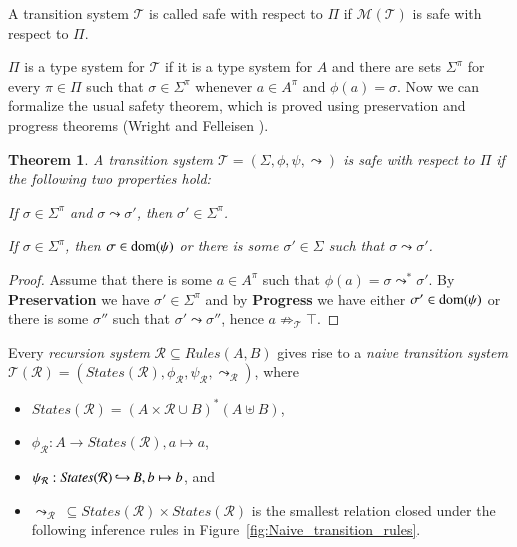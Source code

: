 \documentclass[a4paper,draft,preprint,sort&compress]{elsarticle}
\newtheorem{theorem}[definition]{Theorem}
\newcommand{\M}{\ensuremath{\mathcal{M}}}
\newcommand{\R}{\ensuremath{\mathcal{R}}}
\newcommand{\T}{\ensuremath{\mathcal{T}}}
\newcommand{\Rules}{\ensuremath{\mathit{Rules}}}
\newcommand{\States}{\ensuremath{\mathit{States}}}
\begin{document}
A transition system $\T$ is called safe with respect to $\Pi$ if $\M(\T)$ is safe with respect to $\Pi$.

$\Pi$ is a type system for $\T$ if it is a type system for $A$ and there are sets $\Sigma^\pi$ for
every $\pi \in \Pi$ such that $\sigma \in \Sigma^\pi$ whenever $a \in A^\pi$ and $\phi(a) = \sigma$.
Now we can formalize the usual safety theorem, which is proved using preservation and progress
theorems (Wright and Felleisen \cite{WrightFelleisen94}).

\begin{theorem}
  A transition system $\T = (\Sigma,\phi,\psi,\leadsto)$ is safe with respect to $\Pi$
  if the following two properties hold:
  \begin{description}[labelindent=\parindent,style=nextline]
  \item[Preservation] 

    If $\sigma \in \Sigma^\pi$ and $\sigma \leadsto \sigma'$, then $\sigma' \in \Sigma^\pi$.

  \item[Progress] 

    If \mbox{$\sigma \in \Sigma^\pi$}, then \mbox{$\sigma \in \operatorname{dom}(\psi)$} or there is some
    \mbox{$\sigma' \in \Sigma$} such that \mbox{$\sigma \leadsto \sigma'$}.
    
  \end{description}
\end{theorem}

\begin{proof}
  Assume that there is some $a \in A^\pi$ such that \mbox{$\phi(a) = \sigma \leadsto^* \sigma'$}.
  By \textbf{Preservation} we have $\sigma' \in \Sigma^\pi$ and by \textbf{Progress} we have either
  $\sigma' \in \operatorname{dom}(\psi)$ or there is some $\sigma''$ such that $\sigma' \leadsto \sigma''$,
  hence $a \not\Rightarrow_\T \top$.
\end{proof}

Every \emph{recursion system} $\R \subseteq \Rules(A,B)$ gives rise to a \emph{naive transition system}
$\T(\R) = (\States(\R),\phi_\R,\psi_\R,\leadsto_\R)$, where
\begin{itemize}
\item $\States(\R) = (A \times \R \cup B)^*(A \uplus B)$,
\item $\phi_\R: A \to \States(\R), a \mapsto a$,
\item $\psi_\R: \States(\R) \pto B, b \mapsto b$, and
\item $\leadsto_\R~\subseteq \States(\R) \times \States(\R)$ is the smallest relation closed under the following
  inference rules in Figure~\ref{fig:Naive_transition_rules}.
\end{itemize}
\end{document}

